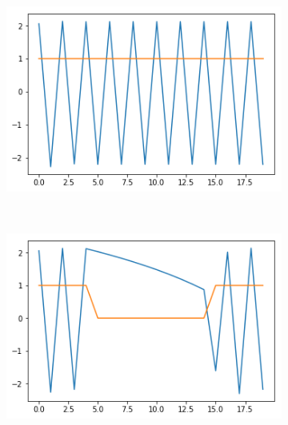 \documentclass[12pt, letterpaper]{article}
\begin{document}
\begin{figure}[h]
    \centering
    \begin{subfigure}[b]{0.3\textwidth}
        \includegraphics[width=\textwidth]{f1}
        \label{fig:gull}
    \end{subfigure}
    ~ %
    \begin{subfigure}[b]{0.3\textwidth}
        \includegraphics[width=\textwidth]{f2}
        \label{fig:tiger}
    \end{subfigure}
    ~ %
    \begin{subfigure}[b]{0.3\textwidth}

\end{subfigure}
\end{figure}
\end{document}
